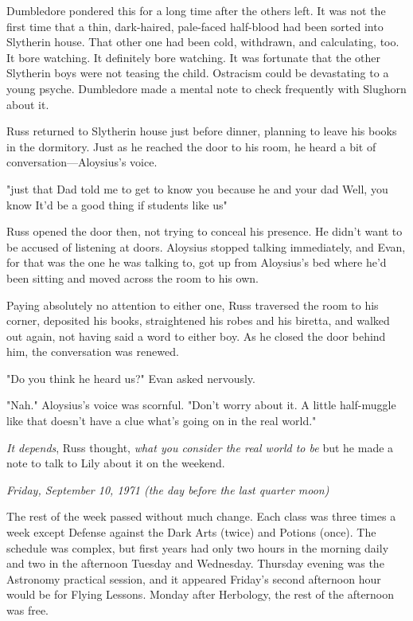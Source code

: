 Dumbledore pondered this for a long time after the others left. It was not the first time that a thin, dark-haired, pale-faced half-blood had been sorted into Slytherin house. That other one had been cold, withdrawn, and calculating, too. It bore watching. It definitely bore watching. It was fortunate that the other Slytherin boys were not teasing the child. Ostracism could be devastating to a young psyche. Dumbledore made a mental note to check frequently with Slughorn about it.

Russ returned to Slytherin house just before dinner, planning to leave his books in the dormitory. Just as he reached the door to his room, he heard a bit of conversation—Aloysius's voice.

"{\el}just that Dad told me to get to know you because he and your dad{\el} Well, you know{\el} It'd be a good thing if students like us{\el}"

Russ opened the door then, not trying to conceal his presence. He didn't want to be accused of listening at doors. Aloysius stopped talking immediately, and Evan, for that was the one he was talking to, got up from Aloysius's bed where he'd been sitting and moved across the room to his own.

Paying absolutely no attention to either one, Russ traversed the room to his corner, deposited his books, straightened his robes and his biretta, and walked out again, not having said a word to either boy. As he closed the door behind him, the conversation was renewed.

"Do you think he heard us?" Evan asked nervously.

"Nah." Aloysius's voice was scornful. "Don't worry about it. A little half-muggle like that doesn't have a clue what's going on in the real world."

\emph{It depends}, Russ thought, \emph{what you consider the real world to be}{\el} but he made a note to talk to Lily about it on the weekend.

\emph{Friday, September 10, 1971 (the day before the last quarter moon)}

The rest of the week passed without much change. Each class was three times a week except Defense against the Dark Arts (twice) and Potions (once). The schedule was complex, but first years had only two hours in the morning daily and two in the afternoon Tuesday and Wednesday. Thursday evening was the Astronomy practical session, and it appeared Friday's second afternoon hour would be for Flying Lessons. Monday after Herbology, the rest of the afternoon was free.

